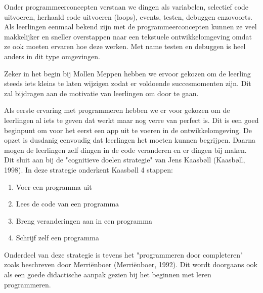 \documentclass{BYUTextbook}
\begin{document}
Onder programmeerconcepten verstaan we dingen als variabelen, selectief code uitvoeren, herhaald code uitvoeren (loops), events, testen, debuggen enzovoorts. Als leerlingen eenmaal bekend zijn met de programmeerconcepten kunnen ze veel makkelijker en sneller overstappen naar een tekstuele ontwikkelomgeving omdat ze ook moeten ervaren hoe deze werken. Met name testen en debuggen is heel anders in dit type omgevingen.

Zeker in het begin bij Mollen Meppen hebben we ervoor gekozen om de leerling steeds iets kleins te laten wijzigen zodat er voldoende succesmomenten zijn. Dit zal bijdragen aan de motivatie van leerlingen om door te gaan.

Als eerste ervaring met programmeren hebben we er voor gekozen om de leerlingen al iets te geven dat werkt maar nog verre van perfect is. Dit is een goed beginpunt om voor het eerst een app uit te voeren in de ontwikkelomgeving. De opzet is dusdanig eenvoudig dat leerlingen het moeten kunnen begrijpen. Daarna mogen de leerlingen zelf dingen in de code veranderen en er dingen bij maken. Dit sluit aan bij de "cognitieve doelen strategie" van Jens Kaasb\o ll (Kaasb\o ll, 1998). In deze strategie onderkent Kaasb\o ll 4 stappen:
\begin{enumerate}
  \item Voer een programma uit
  \item Lees de code van een programma
  \item Breng veranderingen aan in een programma
  \item Schrijf zelf een programma
\end{enumerate}

Onderdeel van deze strategie is tevens het "programmeren door completeren" zoals beschreven door Merri\"{e}nboer (Merri\"{e}nboer, 1992). Dit wordt doorgaans ook als een goede didactische aanpak gezien bij het beginnen met leren programmeren.
\end{document}
